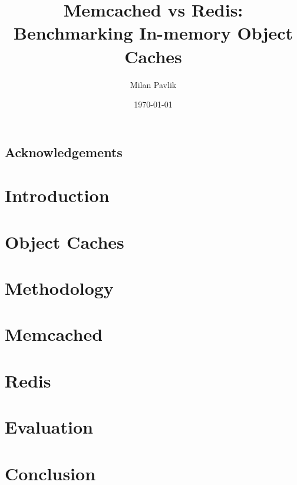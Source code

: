 \documentclass[bsc,frontabs,twoside,singlespacing,parskip,deptreport]{infthesis}
\begin{document}
\title{Memcached vs Redis: Benchmarking In-memory Object Caches}

\author{Milan Pavlik}



\date{\today}

\abstract{}

\maketitle

\section*{Acknowledgements}


\tableofcontents



\chapter{Introduction}



\chapter{Object Caches}


\chapter{Methodology}


\chapter{Memcached}


\chapter{Redis}


\chapter{Evaluation}


\chapter{Conclusion}







\end{document}

